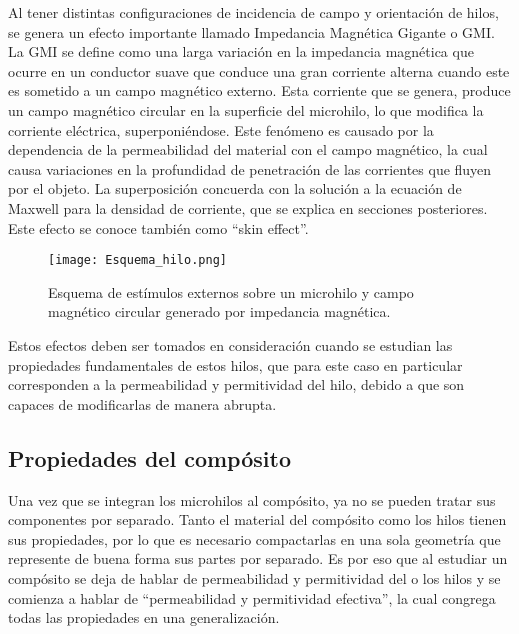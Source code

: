 \documentclass[12pt,letterpaper]{article}
\numberwithin{equation}{section}
\begin{document}
Al tener distintas configuraciones de incidencia de campo y orientación de hilos, se genera un efecto importante llamado Impedancia Magnética Gigante o GMI. La GMI se define como una larga variación en la impedancia magnética que ocurre en un conductor suave que conduce una gran corriente alterna cuando este es sometido a un campo magnético externo. Esta corriente que se genera, produce un campo magnético circular en la superficie del microhilo, lo que modifica la corriente eléctrica, superponiéndose.
Este fenómeno es causado por la dependencia de la permeabilidad del material con el campo magnético, la cual causa variaciones en la profundidad de penetración de las corrientes que fluyen por el objeto. La superposición concuerda con la solución a la ecuación de Maxwell para la densidad de corriente, que se explica en secciones posteriores. Este efecto se conoce también como ``skin effect''.

\begin{figure}[H]
	\centering\texttt{[image: Esquema\_hilo.png]}\\
	\caption{Esquema de estímulos externos sobre un microhilo y campo magnético circular generado por impedancia magnética. \cite{Wire_theory_1}}
	\label{fig:Esquema_hilo}
\end{figure} 


Estos efectos deben ser tomados en consideración cuando se estudian las propiedades fundamentales de estos hilos, que para este caso en particular corresponden a la permeabilidad y permitividad del hilo, debido a que son capaces de modificarlas de manera abrupta.

\subsection{Propiedades del compósito}

Una vez que se integran los microhilos al compósito, ya no se pueden tratar sus componentes por separado. Tanto el material del compósito como los hilos tienen sus propiedades, por lo que es necesario compactarlas en una sola geometría que represente de buena forma sus partes por separado. Es por eso que al estudiar un compósito se deja de hablar de permeabilidad y permitividad del o los hilos y se comienza a hablar de ``permeabilidad y permitividad efectiva'', la cual congrega todas las propiedades en una generalización.
\end{document}
